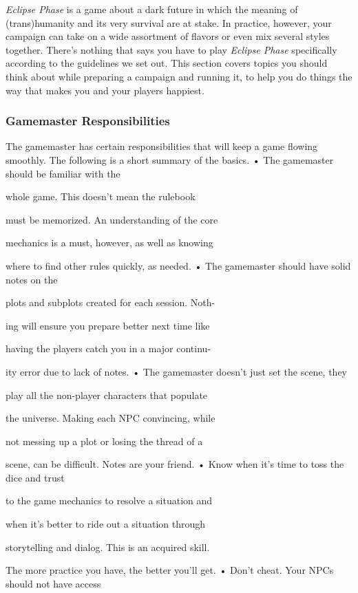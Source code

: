 \textit{Eclipse Phase} is a game about a dark future in which 
the meaning of (trans)humanity and its very survival 
are at stake. In practice, however, your campaign can 
take on a wide assortment of flavors or even mix 
several styles together. There's nothing that says you 
have to play \textit{Eclipse Phase} specifically according to 
the guidelines we set out. This section covers topics 
you should think about while preparing a campaign 
and running it, to help you do things the way that 
makes you and your players happiest.

\subsubsection{Gamemaster Responsibilities }

The gamemaster has certain responsibilities that will 
keep a game flowing smoothly. The following is a 
short summary of the basics.
•  The gamemaster should be familiar with the 

whole game. This doesn't mean the rulebook 

must be memorized. An understanding of the core 

mechanics is a must, however, as well as knowing 

where to find other rules quickly, as needed. 
•  The gamemaster should have solid notes on the 

plots and subplots created for each session. Noth-

ing will ensure you prepare better next time like 

having the players catch you in a major continu-

ity error due to lack of notes.
•  The gamemaster doesn't just set the scene, they 

play all the non-player characters that populate 

the universe. Making each NPC convincing, while 

not messing up a plot or losing the thread of a 

scene, can be difficult. Notes are your friend. 
•  Know when it's time to toss the dice and trust 

to the game mechanics to resolve a situation and 

when it's better to ride out a situation through 

storytelling and dialog. This is an acquired skill. 

The more practice you have, the better you'll get. 
•  Don't cheat. Your NPCs should not have access 

